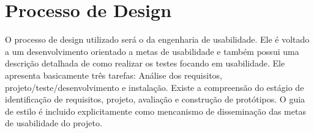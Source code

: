 \chapter[Processo de Design]{Processo de Design}

O processo de design utilizado será o da engenharia de usabilidade. Ele é voltado a um desenvolvimento orientado a metas de usabilidade e também possui uma descrição detalhada de como realizar os testes focando em usabilidade. Ele apresenta basicamente três tarefas: Análise dos requisitos, projeto/teste/desenvolvimento e instalação. Existe a compreensão do estágio de identificação de requisitos, projeto, avaliação e construção de protótipos. O guia de estilo é incluido explicitamente como mencanismo de disseminação das metas de usabilidade do projeto.

